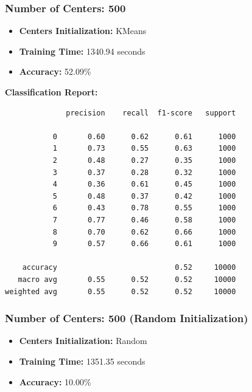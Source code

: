 \documentclass[lettersize,journal]{IEEEtran}
\begin{document}
\subsubsection{\textbf{Number of Centers: 500}}
\begin{itemize}
    \item \textbf{Centers Initialization:} KMeans
    \item \textbf{Training Time:} 1340.94 seconds
    \item \textbf{Accuracy:} 52.09\%
\end{itemize}

\textbf{Classification Report:}
\begin{scriptsize}
\begin{verbatim}
              precision    recall  f1-score   support

           0       0.60      0.62      0.61      1000
           1       0.73      0.55      0.63      1000
           2       0.48      0.27      0.35      1000
           3       0.37      0.28      0.32      1000
           4       0.36      0.61      0.45      1000
           5       0.48      0.37      0.42      1000
           6       0.43      0.78      0.55      1000
           7       0.77      0.46      0.58      1000
           8       0.70      0.62      0.66      1000
           9       0.57      0.66      0.61      1000

    accuracy                           0.52     10000
   macro avg       0.55      0.52      0.52     10000
weighted avg       0.55      0.52      0.52     10000
\end{verbatim}
\end{scriptsize}
\subsubsection{\textbf{Number of Centers: 500 (Random Initialization)}}
\begin{itemize}
    \item \textbf{Centers Initialization:} Random
    \item \textbf{Training Time:} 1351.35 seconds
    \item \textbf{Accuracy:} 10.00\%
\end{itemize}
\end{document}
